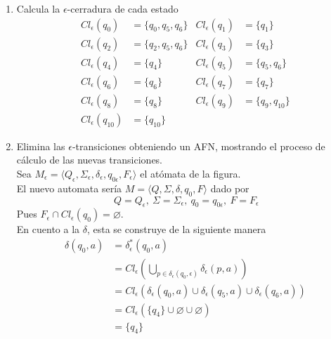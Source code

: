 \documentclass{article}
\begin{document}
\begin{enumerate}
{\begin{figure} [H]
    		\end{figure}
    		\begin{enumerate}
    			\item {
    				Calcula la $\epsilon$-cerradura de cada estado
    				\begin{align*}
    					Cl_{\epsilon}(q_{0}) &= \{q_{0}, q_{5}, q_{6}\}
    					&Cl_{\epsilon}(q_{1}) &= \{q_{1}\} \\
    					Cl_{\epsilon}(q_{2}) &= \{q_{2}, q_{5}, q_{6}\}
    					&Cl_{\epsilon}(q_{3}) &= \{q_{3}\} \\
    					Cl_{\epsilon}(q_{4}) &= \{q_{4}\}
    					&Cl_{\epsilon}(q_{5}) &= \{q_{5}, q_{6}\} \\
    					Cl_{\epsilon}(q_{6}) &= \{q_{6}\}
    					&Cl_{\epsilon}(q_{7}) &= \{q_{7}\} \\
    					Cl_{\epsilon}(q_{8}) &= \{q_{8}\}
    					&Cl_{\epsilon}(q_{9}) &= \{q_{9}, q_{10}\} \\
    					Cl_{\epsilon}(q_{10}) &= \{q_{10}\} 
    				\end{align*}
				}
				\item {
					Elimina las $\epsilon$-transiciones obteniendo un AFN, 
					mostrando el proceso de cálculo de las nuevas transiciones.\\
					Sea $M_{\epsilon} = \langle Q_{\epsilon}, \Sigma_{\epsilon},
					 \delta_{\epsilon}, q_{0\epsilon}, F_{\epsilon} \rangle$ el atómata de la figura.\\
					El nuevo automata sería $M = \langle Q, \Sigma, \delta, 
					q_{0}, F \rangle$ dado por 
					\[\ Q = Q_{\epsilon},\ \Sigma = \Sigma_{\epsilon},
					\ q_0 = q_{0\epsilon},\ F = F_{\epsilon}\]
					Pues $F_{\epsilon} \cap Cl_{\epsilon}(q_{0}) = \varnothing$.\\
					En cuento a la $\delta$, esta se construye de la siguiente 
					manera
					\begin{align*}
						\delta(q_{0}, a) &= \delta^{*}_{\epsilon}(q_{0}, a) \\
						&= Cl_{\epsilon}(\bigcup_{p \in \delta_{\epsilon}(q_{0}, \epsilon)}
						{\delta_{\epsilon}(p, a)}) \\
						&= Cl_{\epsilon}(\delta_{\epsilon}(q_{0}, a) 
						\cup \delta_{\epsilon}(q_{5}, a)
						\cup \delta_{\epsilon}(q_{6}, a))\\
						&= Cl_{\epsilon}(\{q_{4}\} \cup \varnothing \cup \varnothing)\\
						&= \{q_{4}\}
					\end{align*}

}
\end{enumerate}}
\end{enumerate}
\end{document}
